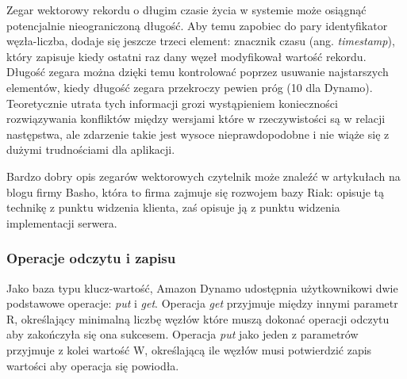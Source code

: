 Zegar wektorowy rekordu o długim czasie życia w systemie może osiągnąć potencjalnie nieograniczoną długość.
Aby temu zapobiec do pary identyfikator węzła-liczba, dodaje się jeszcze trzeci element: znacznik czasu (ang. \emph{timestamp}), który zapisuje kiedy ostatni raz dany węzeł modyfikował wartość rekordu.
Długość zegara można dzięki temu kontrolować poprzez usuwanie najstarszych elementów, kiedy długość zegara przekroczy pewien próg (10 dla Dynamo).
Teoretycznie utrata tych informacji grozi wystąpieniem konieczności rozwiązywania konfliktów między wersjami które w rzeczywistości są w relacji następstwa, ale zdarzenie takie jest wysoce nieprawdopodobne i nie wiąże się z dużymi trudnościami dla aplikacji.

Bardzo dobry opis zegarów wektorowych czytelnik może znaleźć w artykułach na blogu firmy Basho, która to firma zajmuje się rozwojem bazy Riak: \cite{basho-vector-clocks-easy} opisuje tą technikę z punktu widzenia klienta, zaś \cite{basho-vector-clocks-hard} opisuje ją z punktu widzenia implementacji serwera.

\subsubsection*{Operacje odczytu i zapisu}

Jako baza typu klucz-wartość, Amazon Dynamo udostępnia użytkownikowi dwie podstawowe operacje: \emph{put} i \emph{get}.
Operacja \emph{get} przyjmuje między innymi parametr R, określający minimalną liczbę węzłów które muszą dokonać operacji odczytu aby zakończyła się ona sukcesem.
Operacja \emph{put} jako jeden z parametrów przyjmuje z kolei wartość W, określającą ile węzłów musi potwierdzić zapis wartości aby operacja się powiodła.

